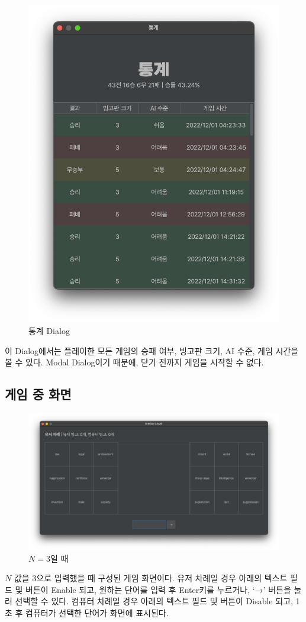 \begin{figure}[H]
    \centering
    \includegraphics[scale=0.35]{img/statistic.png}
    \caption{통계 Dialog}
\end{figure}
이 Dialog에서는 플레이한 모든 게임의 승패 여부, 빙고판 크기, AI 수준, 게임 시간을 볼 수 있다.
Modal Dialog이기 때문에, 닫기 전까지 게임을 시작할 수 없다.

\newpage
\subsection{게임 중 화면}
\begin{figure}[H]
    \centering
    \includegraphics[scale=0.3]{img/game-3x3.png}
    \caption{$N = 3$일 때}
\end{figure}
$N$ 값을 3으로 입력했을 때 구성된 게임 화면이다.
유저 차례일 경우 아래의 텍스트 필드 및 버튼이 Enable 되고, 원하는 단어를 입력 후 Enter키를 누르거나, `→' 버튼을 눌러 선택할 수 있다.
컴퓨터 차례일 경우 아래의 텍스트 필드 및 버튼이 Disable 되고, 1초 후 컴퓨터가 선택한 단어가 화면에 표시된다.

